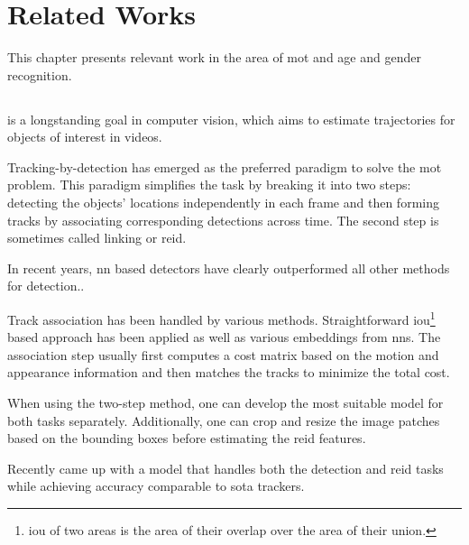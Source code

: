 \chapter{Related Works}\label{ch:related}

This chapter presents relevant work in the area of \gls{mot} and age and gender recognition.

\section{}

 is a longstanding goal in computer vision\cite{zhang2020fair, Bewley_2016_SORT, MOT16}, which aims to estimate trajectories for objects of interest in videos.

Tracking-by-detection has emerged as the preferred paradigm to solve the \gls{mot} problem\cite{MOT16, Wojke2017_DeepSORT}. This paradigm simplifies the task by breaking it into two steps: detecting the objects' locations independently in each frame and then forming tracks by associating corresponding detections across time. The second step is sometimes called linking or \gls{reid}.

In recent years,  \gls{nn}  based  detectors  have  clearly outperformed all other methods for detection.\cite{ren2015fasterRCNN, yolo}. 

Track association has been handled by various methods. Straightforward \gls{iou}\footnote{\gls{iou} of two areas is the area of their overlap over the area of their union.} based approach has been applied\cite{bochinski2017high_IOUtracking} as well as various embeddings from \glspl{nn}\cite{Wojke2017_DeepSORT}. The association step usually first computes a cost matrix based on the motion and appearance information and then matches the tracks to minimize the total cost.

When using the two-step method, one can develop the most suitable model for both tasks separately. Additionally, one can crop and resize the image patches based on the bounding boxes before estimating the \gls{reid} features.

Recently \cite{zhang2020fair} came up with a model that handles both the detection and \gls{reid} tasks while achieving accuracy comparable to \gls{sota} trackers.\cite{MOT16}

